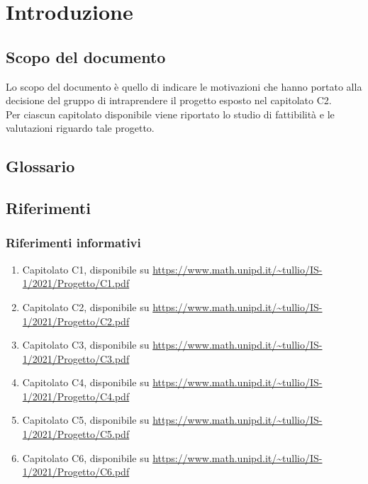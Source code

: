 \section{Introduzione}\label{section:introduzione}

\subsection{Scopo del documento}
	Lo scopo del documento è quello di indicare le motivazioni che hanno portato alla decisione del gruppo di intraprendere il progetto esposto nel capitolato C2.\\
	Per ciascun capitolato disponibile viene riportato lo studio di fattibilità e le valutazioni riguardo tale progetto. 

\subsection{Glossario}
	\gloDesc

\subsection{Riferimenti}
	\subsubsection{Riferimenti informativi}
		\begin{enumerate}
			\item \guillemotleft Capitolato C1\guillemotright, disponibile su \url{https://www.math.unipd.it/~tullio/IS-1/2021/Progetto/C1.pdf}
			\item \guillemotleft Capitolato C2\guillemotright, disponibile su \url{https://www.math.unipd.it/~tullio/IS-1/2021/Progetto/C2.pdf}
			\item \guillemotleft Capitolato C3\guillemotright, disponibile su \url{https://www.math.unipd.it/~tullio/IS-1/2021/Progetto/C3.pdf}
			\item \guillemotleft Capitolato C4\guillemotright, disponibile su \url{https://www.math.unipd.it/~tullio/IS-1/2021/Progetto/C4.pdf}
			\item \guillemotleft Capitolato C5\guillemotright, disponibile su \url{https://www.math.unipd.it/~tullio/IS-1/2021/Progetto/C5.pdf}
			\item \guillemotleft Capitolato C6\guillemotright, disponibile su \url{https://www.math.unipd.it/~tullio/IS-1/2021/Progetto/C6.pdf}
		\end{enumerate}



